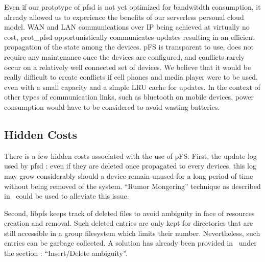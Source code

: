 Even if our prototype of pfsd is not yet optimized for bandwitdth
consumption, it already allowed us to experience the benefits of our
serverless personal cloud model. WAN and LAN communications over IP
being achieved at virtually no cost, prot\_pfsd opportunistically
communicates updates resulting in an efficient propagation of the
state among the devices. pFS is transparent to use, does not require
any maintenance once the devices are configured, and conflicts rarely
occur on a relatively well connected set of devices. We believe that
it would be really difficult to create conflicts if cell phones and
media player were to be used, even with a small capacity and a simple
LRU cache for updates. In the context of other types of communication
links, such as bluetooth on mobile devices, power consumption would
have to be considered to avoid wasting batteries.

\subsection{Hidden Costs}

There is a few hidden costs associated with the use of pFS. First, the
update log used by pfsd : even if they are deleted once propagated to
every devices, this log may grow considerably should a device remain
unused for a long period of time without being removed of the
system. ``Rumor Mongering'' technique as described
in~\cite{demers:epidemic} could be used to alleviate this issue.

Second, libpfs keeps track of deleted files to avoid ambiguity
in face of resources creation and removal. Such deleted entries are
only kept for directories that are still accessible in a group
filesystem which limits their number. Nevertheless, such entries can
be garbage collected. A solution has already been provided
in~\cite{page:ficus} under the section : ``Insert/Delete ambiguity''.

\endinput


